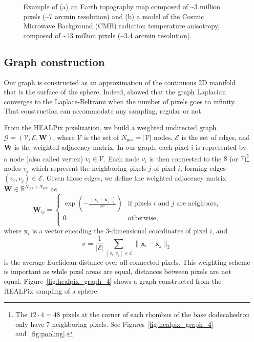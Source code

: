\documentclass[final,twocolumn,3p,times,authoryear]{elsarticle}
\newcommand{\figref}[1]{Figure~\ref{fig:#1}}
\renewcommand{\b}[1]{{\bm{#1}}}   %
\newcommand{\1}{\b{1}}              %
\newcommand{\0}{\b{0}}              %
\newcommand{\G}{\mathcal{G}}
\newcommand{\V}{\mathcal{V}}
\newcommand{\E}{\mathcal{E}}
\newcommand{\W}{\b{W}}
\newcommand{\x}{\b{x}}
\newcommand{\R}{\mathbb{R}}
\begin{document}
\begin{figure}
\begin{subfigure}[b]{0.45\linewidth}
		\caption{}
		\label{fig:example_cmb}
	\end{subfigure}
	\caption[]{Example of (a) an Earth topography map composed of \textasciitilde 3 million pixels (\textasciitilde 7 arcmin resolution) and (b) a model of the Cosmic Microwave Background (CMB) radiation temperature anisotropy, composed of \textasciitilde 13 million pixels (\textasciitilde 3.4 arcmin resolution).\footnotemark}
	\label{fig:example_maps}
\end{figure}


\subsection{Graph construction}

Our graph is constructed as an approximation of the continuous 2D manifold that is the surface of the sphere. Indeed, \citet{belkin2007convergence} showed that the graph Laplacian converges to the Laplace-Beltrami when the number of pixels goes to infinity. That construction can accommodate any sampling, regular or not.

From the HEALPix pixelization, we build a weighted undirected graph $\G = (\V, \E, \W)$, where $\V$ is the set of $N_{pix} = |\V|$ nodes, $\E$ is the set of edges, and $\W$ is the weighted adjacency matrix. In our graph, each pixel $i$ is represented by a node (also called vertex) $v_i \in \V$. Each node $v_i$ is then connected to the $8$ (or $7$)\footnote{\label{neighbors}The $12 \cdot 4 = 48$ pixels at the corner of each rhombus of the base dodecahedron only have 7 neighboring pixels. See Figures~\ref{fig:healpix_graph_4} and~\ref{fig:pooling}.} nodes $v_j$ which represent the neighboring pixels $j$ of pixel $i$, forming edges $(v_i, v_j) \in \E$. Given those edges, we define the weighted adjacency matrix $\W \in \R^{N_{pix} \times N_{pix}}$ as
\begin{equation*}
	\W_{ij} = \begin{cases}
		\exp \left( -\frac{\|\x_i-\x_j\|_2^2}{\sigma^2} \right) & \text{if pixels $i$ and $j$ are neighbors,} \\
		0 & \text{otherwise,} \\
	\end{cases}
\end{equation*}
where $\x_i$ is a vector encoding the 3-dimensional coordinates of pixel $i$, and
\begin{equation*}
	\sigma = \frac{1}{|\E|} \sum_{(v_i, v_j) \in \E} \|\x_i-\x_j\|_2
\end{equation*}
is the average Euclidean distance over all connected pixels. This weighting scheme is important as while pixel areas are equal, distances between pixels are not equal. \figref{healpix_graph_4} shows a graph constructed from the HEALPix sampling of a sphere.
\end{document}
